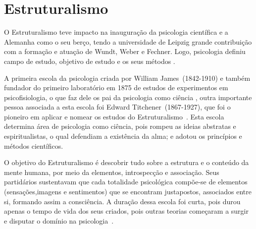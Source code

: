 \section{Estruturalismo}\label{estruturalismo}

O Estruturalismo teve impacto na inauguração da psicologia científica e a Alemanha como o seu berço, tendo a universidade de Leipzig grande contribuição com a formação e atuação de Wundt, Weber e Fechner.
Logo, psicologia definiu campo de estudo, objetivo de estudo e os seus métodos \cite{bock1999psicologias}. 

A primeira escola da psicologia criada por William James~(1842-1910) e também fundador do primeiro laboratório em 1875 de estudos de experimentos em psicofisiologia, o que faz dele os pai da psicologia como ciência , outra importante pessoa associada a esta escola foi Edward Titchener~(1867-1927), que foi o pioneiro em aplicar e nomear os estudos do Estruturalismo~\cite{hothersall1997historia,bock1999psicologias}. 
Esta escola determina área de psicologia como ciência, pois rompeu as ideias abstratas e espiritualistas, o qual defendiam a existência da alma; e adotou os princípios e métodos científicos. 

O objetivo do Estruturalismo é descobrir tudo sobre a estrutura e o conteúdo da mente humana, por meio da elementos, introspecção e associação.
Seus partidários sustentavam que cada totalidade psicológica compõe-se de elementos (sensações,imagens e sentimentos) que se encontram justapostos, associados entre si, formando assim a consciência.
A duração dessa escola foi curta, pois durou apenas o tempo de vida dos seus criados, pois outras teorias começaram a surgir e disputar o domínio na psicologia~\cite{silva2007psicologia_educacao}.  
